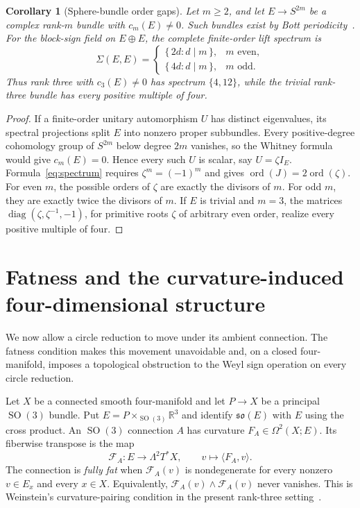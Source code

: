 \documentclass[11pt]{amsart}
\newcommand{\ord}{\operatorname{ord}}
\newcommand{\SO}{\operatorname{SO}}
\theoremstyle{plain}
\newtheorem{corollary}[theorem]{Corollary}
\theoremstyle{definition}
\theoremstyle{remark}
\begin{document}
\begin{corollary}[Sphere-bundle order gaps]\label{cor:sphere-spectrum}
Let $m\geq2$, and let $E\to S^{2m}$ be a complex rank-$m$ bundle
with $c_m(E)\ne0$. Such bundles exist by Bott periodicity~\cite{Bott}.
For the block-sign field on $E\oplus E$, the complete finite-order
lift spectrum is
\[
 \Sigma(E,E)=
 \begin{cases}
 \{\,2d:d\mid m\,\},&m\text{ even},\\
 \{\,4d:d\mid m\,\},&m\text{ odd}.
 \end{cases}
\]
Thus rank three with $c_3(E)\ne0$ has spectrum $\{4,12\}$, while the
trivial rank-three bundle has every positive multiple of four.
\end{corollary}

\begin{proof}
If a finite-order unitary automorphism $U$ has distinct eigenvalues,
its spectral projections split $E$ into nonzero proper subbundles.
Every positive-degree cohomology group of $S^{2m}$ below degree $2m$
vanishes, so the Whitney formula would give $c_m(E)=0$. Hence every
such $U$ is scalar, say $U=\zeta I_E$. Formula~\eqref{eq:spectrum}
requires $\zeta^m=(-1)^m$ and gives $\ord(J)=2\ord(\zeta)$.
For even $m$, the possible orders of $\zeta$ are exactly the divisors
of $m$. For odd $m$, they are exactly twice the divisors of $m$.
If $E$ is trivial and $m=3$, the matrices
$\operatorname{diag}(\zeta,\zeta^{-1},-1)$, for primitive roots $\zeta$
of arbitrary even order, realize every positive multiple of four.
\end{proof}

\section{Fatness and the curvature-induced four-dimensional structure}

We now allow a circle reduction to move under its ambient connection.  The fatness condition makes this movement unavoidable and, on a closed four-manifold, imposes a topological obstruction to the Weyl sign operation on every circle reduction.

Let $X$ be a connected smooth four-manifold and let $P\to X$ be a
principal $\SO(3)$ bundle.  Put $E=P\times_{\SO(3)}\mathbb R^3$ and
identify $\mathfrak{so}(E)$ with $E$ using the cross product.  An
$\SO(3)$ connection $A$ has curvature $F_A\in\Omega^2(X;E)$.  Its
fiberwise transpose is the map
\begin{equation}\label{eq:curvature-map}
 \mathscr F_A:E\longrightarrow\Lambda^2T^*X,
 \qquad v\longmapsto\langle F_A,v\rangle.
\end{equation}
The connection is \emph{fully fat} when $\mathscr F_A(v)$ is
nondegenerate for every nonzero $v\in E_x$ and every $x\in X$.
Equivalently, $\mathscr F_A(v)\wedge\mathscr F_A(v)$ never vanishes.
This is Weinstein's curvature-pairing condition in the present rank-three setting~\cite{Weinstein}.
\end{document}

